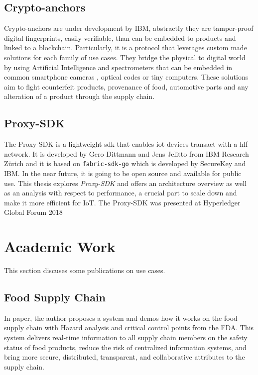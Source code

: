 \subsection{Crypto-anchors}
Crypto-anchors \cite{crypto-anchor} are under development by IBM, abstractly they are tamper-proof digital fingerprints, easily verifiable, than can be embedded to products and linked to a blockchain. Particularly, it is a protocol that leverages custom made solutions for each family of use cases. They bridge the physical to digital world by using Artificial Intelligence and spectrometers that can be embedded in common smartphone cameras \cite{spectometers}, optical codes or tiny computers. These solutions aim to fight counterfeit products, provenance of food, automotive parts and any alteration of a product through the supply chain.
\subsection{Proxy-SDK}
The Proxy-SDK \cite{proxy-sdk} is a lightweight \acrshort{sdk} that enables \acrshort{iot} devices transact with a \acrlong{hlf} network. It is developed by Gero Dittmann \cite{gero} and Jens Jelitto \cite{jens} from IBM Research Zürich and it is based on \verb|fabric-sdk-go| \cite{fabric-sdk-go} which is developed by SecureKey and IBM. In the near future, it is going to be open source and available for public use. This thesis explores \textit{Proxy-SDK} and offers an architecture overview as well as an analysis with respect to performance, a crucial part to scale down and make it more efficient for IoT.
The Proxy-SDK was presented at Hyperledger Global Forum 2018 \cite{proxy-sdk}

\section{Academic Work}
This section discuses some publications on use cases. 

\subsection{Food Supply Chain}
In paper, \cite{tian2017supply} the author proposes a system and demos how it works on the food supply chain with Hazard analysis and critical control points from the FDA. This system delivers real-time information to all supply chain members on the safety status of food products, reduce the risk of centralized information systems, and bring more secure, distributed, transparent, and collaborative attributes to the supply chain.

